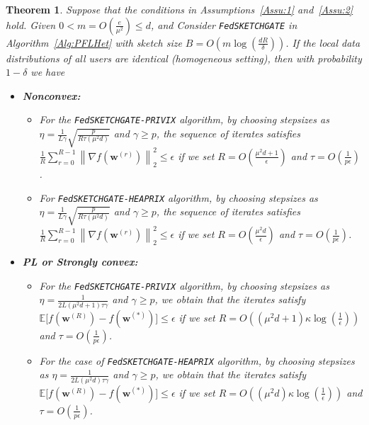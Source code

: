 \documentclass[twoside]{article}
\newtheorem{theorem}{Theorem}
\begin{document}
\begin{theorem}\label{thm:hetreg_case}
  Suppose that the conditions in Assumptions~\ref{Assu:1} and~\ref{Assu:2} hold. Given $0<m=O\left(\frac{e}{\mu^2}\right)\leq d$, and Consider \texttt{FedSKETCHGATE} in Algorithm~\ref{Alg:PFLHet} with sketch size $B=O\left(m\log\left(\frac{d R}{\delta}\right)\right)$. If the local data distributions of all users are identical (homogeneous setting), then with probability $1-\delta$ we have  
 \begin{itemize}
     \item \textbf{Nonconvex:}  
     \begin{itemize}
         \item [1)] For the \texttt{FedSKETCHGATE-PRIVIX} algorithm, by choosing stepsizes as $\eta=\frac{1}{L\gamma}\sqrt{\frac{p}{R\tau\left(\mu^2d\right)}}$ and $\gamma\geq p$, the sequence of iterates satisfies  $\frac{1}{R}\sum_{r=0}^{R-1}\left\|\nabla f({\boldsymbol{w}}^{(r)})\right\|_2^2\leq {\epsilon}$ if we set
     $R=O\left(\frac{\mu^2d+1}{\epsilon}\right)$ and $ \tau=O\left(\frac{1}{{p}\epsilon}\right)$.
         \item[2)] For \texttt{FedSKETCHGATE-HEAPRIX} algorithm, by choosing stepsizes as $\eta=\frac{1}{L\gamma}\sqrt{\frac{p}{R\tau\left(\mu^2d\right)}}$ and $\gamma\geq p$, the sequence of iterates satisfies  $\frac{1}{R}\sum_{r=0}^{R-1}\left\|\nabla f({\boldsymbol{w}}^{(r)})\right\|_2^2\leq {\epsilon}$ if we set
     $R=O\left(\frac{\mu^2d}{\epsilon}\right)$ and $ \tau=O\left(\frac{1}{{p}\epsilon}\right)$. 
     \end{itemize}
     
     \item \textbf{PL or Strongly convex:}
      \begin{itemize}
          \item[1)] For the \texttt{FedSKETCHGATE-PRIVIX} algorithm, by choosing stepsizes as $\eta=\frac{1}{2L\left({\mu^2d}+1\right)\tau\gamma}$ and $\gamma\geq p$, we obtain that the iterates satisfy $\mathbb{E}\Big[f({\boldsymbol{w}}^{(R)})-f({\boldsymbol{w}}^{(*)})\Big]\leq \epsilon$ if  we set
     $R=O\left(\left(\mu^2d+1\right)\kappa\log\left(\frac{1}{\epsilon}\right)\right)$ and $ \tau=O\left(\frac{1}{p\epsilon}\right)$.
          
          \item[2)] For the case of 
         \texttt{FedSKETCHGATE-HEAPRIX} algorithm,
by choosing stepsizes as $\eta=\frac{1}{2L\left(\mu^2d\right)\tau\gamma}$ and $\gamma\geq p$, we obtain that the iterates satisfy $\mathbb{E}\Big[f({\boldsymbol{w}}^{(R)})-f({\boldsymbol{w}}^{(*)})\Big]\leq \epsilon$ if  we set
     $R=O\left(\left(\mu^2d\right)\kappa\log\left(\frac{1}{\epsilon}\right)\right)$ and $ \tau=O\left(\frac{1}{p\epsilon}\right)$. 
      \end{itemize}
      

\end{itemize}
\end{theorem}
\end{document}
